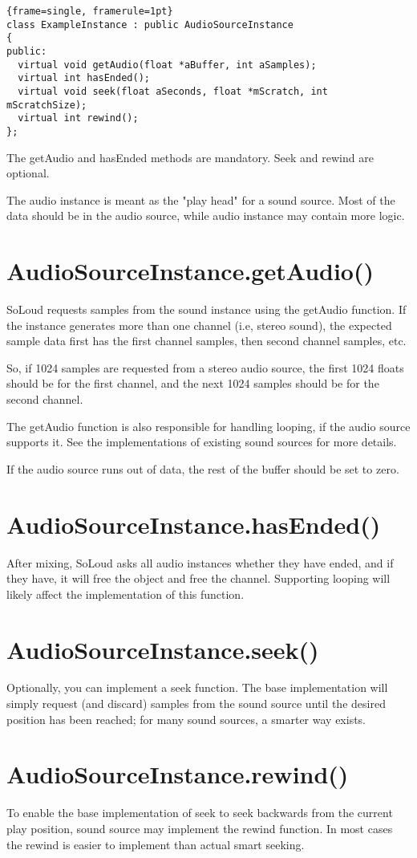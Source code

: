 \begin{lstlisting}{frame=single, framerule=1pt}
class ExampleInstance : public AudioSourceInstance
{
public:
  virtual void getAudio(float *aBuffer, int aSamples);
  virtual int hasEnded();
  virtual void seek(float aSeconds, float *mScratch, int mScratchSize);
  virtual int rewind();
};
\end{lstlisting}

The getAudio and hasEnded methods are mandatory. Seek and rewind are optional.

The audio instance is meant as the "play head" for a sound source. Most of the data should be in the audio source, while audio instance may contain more logic.

\section{AudioSourceInstance.getAudio()}

SoLoud requests samples from the sound instance using the getAudio function. If the instance generates more than one channel (i.e, stereo sound), the expected sample data first has the first channel samples, then second channel samples, etc. 

So, if 1024 samples are requested from a stereo audio source, the first 1024 floats should be for the first channel, and the next 1024 samples should be for the second channel.

The getAudio function is also responsible for handling looping, if the audio source supports it. See the implementations of existing sound sources for more details.

If the audio source runs out of data, the rest of the buffer should be set to zero.

\section{AudioSourceInstance.hasEnded()}

After mixing, SoLoud asks all audio instances whether they have ended, and if they have, it will free the object and free the channel. Supporting looping will likely affect the implementation of this function.

\section{AudioSourceInstance.seek()}

Optionally, you can implement a seek function. The base implementation will simply request (and discard) samples from the sound source until the desired position has been reached; for many sound sources, a smarter way exists.

\section{AudioSourceInstance.rewind()}

To enable the base implementation of seek to seek backwards from the current play position, sound source may implement the rewind function. In most cases the rewind is easier to implement than actual smart seeking.
